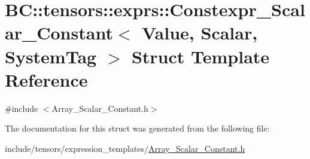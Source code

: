 \hypertarget{structBC_1_1tensors_1_1exprs_1_1Constexpr__Scalar__Constant}{}\section{BC\+:\+:tensors\+:\+:exprs\+:\+:Constexpr\+\_\+\+Scalar\+\_\+\+Constant$<$ Value, Scalar, System\+Tag $>$ Struct Template Reference}
\label{structBC_1_1tensors_1_1exprs_1_1Constexpr__Scalar__Constant}


{\ttfamily \#include $<$Array\+\_\+\+Scalar\+\_\+\+Constant.\+h$>$}



The documentation for this struct was generated from the following file\+:\begin{DoxyCompactItemize}
\item 
include/tensors/expression\+\_\+templates/\hyperlink{Array__Scalar__Constant_8h}{Array\+\_\+\+Scalar\+\_\+\+Constant.\+h}\end{DoxyCompactItemize}
